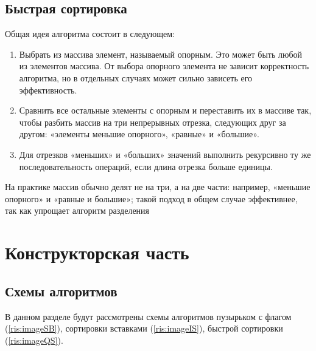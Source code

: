 \documentclass[12pt]{report}
\begin{document}
\section{Быстрая сортировка}
Общая идея алгоритма состоит в следующем:

\begin{enumerate}
  	\item Выбрать из массива элемент, называемый опорным. Это может быть любой из элементов массива. От выбора опорного элемента не зависит корректность алгоритма, но в отдельных случаях может сильно зависеть его эффективность.
	\item Сравнить все остальные элементы с опорным и переставить их в массиве так, чтобы разбить массив на три непрерывных отрезка, следующих друг за другом: «элементы меньшие опорного», «равные» и «большие».
	\item Для отрезков «меньших» и «больших» значений выполнить рекурсивно ту же последовательность операций, если длина отрезка больше единицы.
\end{enumerate}
На практике массив обычно делят не на три, а на две части: например, «меньшие опорного» и «равные и большие»; такой подход в общем случае эффективнее, так как упрощает алгоритм разделения

\chapter{Конструкторская часть}
\section{Схемы алгоритмов}
В данном разделе будут рассмотрены схемы алгоритмов пузырьком с флагом (\ref{ris:imageSB}), сортировки вставками (\ref{ris:imageIS}), быстрой сортировки (\ref{ris:imageQS}).
\end{document}
